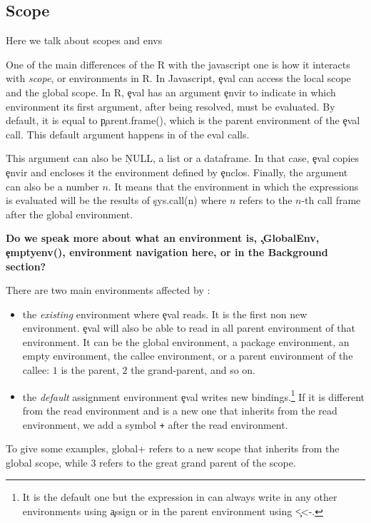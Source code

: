 \documentclass[conference]{IEEEtran}
\begin{document}
\subsection{Scope}

Here we talk about scopes and envs

One of the main differences of the R \eval with the javascript one is how it
interacts with \emph{scope}, or environments in R. In Javascript, \c{eval}
can access the local scope and the global scope. In R, \c{eval} has an
argument \c{envir} to indicate in which environment its first argument,
after being resolved, must be evaluated. By default, it is equal to \c{parent.frame()}, which is the parent environment of the \c{eval} call. This default argument happens in \DefaultEnvirExprPercent of the eval calls.

This argument can also be \c{NULL}, a list or a dataframe. In that case, \c{eval} copies \c{envir} and encloses it the environment defined by \c{enclos}. Finally, the argument can also be a number $n$. It means that the environment in which the expressions is evaluated will be the results of \c{sys.call(n)} where $n$ refers to the $n$-th call frame after the global environment.

\textbf{Do we speak more about what an environment is, \c{.GlobalEnv}, \c{emptyenv()}, environment navigation here, or in the Background section?}

There are two main environments affected by \eval:
\begin{itemize}
	\item the \emph{existing} environment where \c{eval} reads. It is the first non new environment. \c{eval} will also be able to read in all parent environment of that environment. It can be the global environment, a package environment, an empty environment, the callee environment, or a parent environment of the callee: $1$ is the parent, $2$ the grand-parent, and so on.
	\item the \emph{default} assignment environment \c{eval} writes new bindings.\footnote{It is the default one but the expression in \eval can always write in any other environments using \c{assign} or in the parent environment using \c{<<-}.} If it is different from the read environment and is a new one that inherits from the read environment, we add a symbol \texttt{+} after the read environment.
\end{itemize}

To give some examples,  global+ refers to a new scope that inherits from the global scope, while 3 refers to the great grand parent of the \eval scope.
\end{document}
